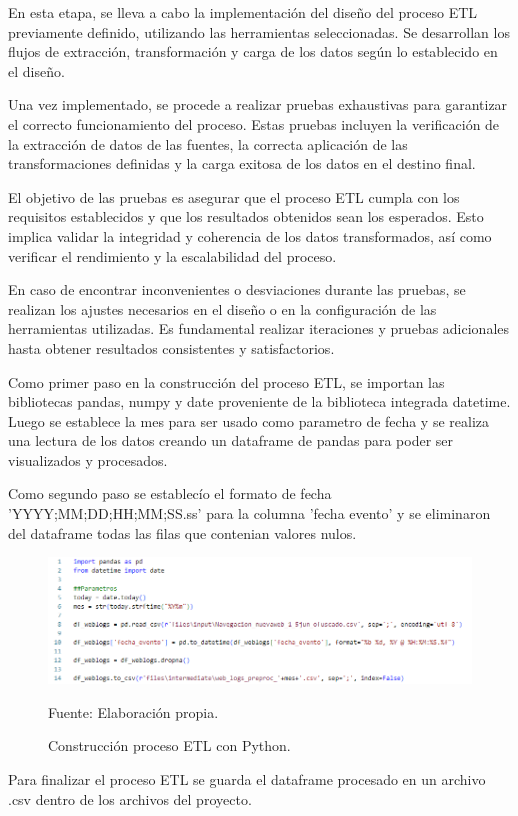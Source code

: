 En esta etapa, se lleva a cabo la implementación del diseño del proceso ETL previamente definido, utilizando las herramientas seleccionadas. Se desarrollan los flujos de extracción, transformación y carga de los datos según lo establecido en el diseño.

Una vez implementado, se procede a realizar pruebas exhaustivas para garantizar el correcto funcionamiento del proceso. Estas pruebas incluyen la verificación de la extracción de datos de las fuentes, la correcta aplicación de las transformaciones definidas y la carga exitosa de los datos en el destino final.

El objetivo de las pruebas es asegurar que el proceso ETL cumpla con los requisitos establecidos y que los resultados obtenidos sean los esperados. Esto implica validar la integridad y coherencia de los datos transformados, así como verificar el rendimiento y la escalabilidad del proceso.

En caso de encontrar inconvenientes o desviaciones durante las pruebas, se realizan los ajustes necesarios en el diseño o en la configuración de las herramientas utilizadas. Es fundamental realizar iteraciones y pruebas adicionales hasta obtener resultados consistentes y satisfactorios.

Como primer paso en la construcción del proceso ETL, se importan las bibliotecas pandas, numpy y date proveniente de la biblioteca integrada datetime. Luego se establece la mes para ser usado como parametro de fecha y se realiza una lectura de los datos creando un dataframe de pandas para poder ser visualizados y procesados.

Como segundo paso se establecío el formato de fecha 'YYYY;MM;DD;HH;MM;SS.ss' para la columna 'fecha evento' y se eliminaron del dataframe todas las filas que contenian valores nulos.


\begin{figure}[H]
    \begin{minipage}[t]{0.8\textwidth}
        \caption{Construcción proceso ETL con Python.}
        \label{construccETL}        
    \end{minipage}

    \vspace{10pt}

    \begin{minipage}[b]{1.1\textwidth}
        \centering
        \includegraphics[width=\textwidth]{img/etl-white-ide.png}        
    \end{minipage}

    \begin{minipage}[t]{0.9\textwidth}
        Fuente: Elaboración propia.
    \end{minipage}
\end{figure}

Para finalizar el proceso ETL se guarda el dataframe procesado en un archivo .csv dentro de los archivos del proyecto.